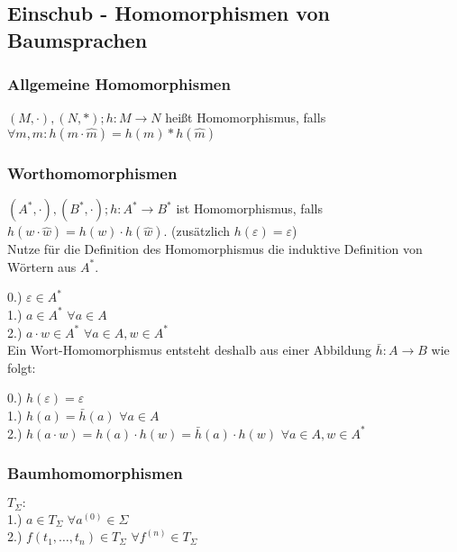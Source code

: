 \documentclass[titlepage]{article}
\begin{document}
\subsection{Einschub - Homomorphismen von Baumsprachen}

\subsubsection{Allgemeine Homomorphismen}

$(M, \cdot), (N, \ast); h: M \to N$ hei\ss t Homomorphismus, falls \\
$\forall m, \hat{m}: h(m \cdot \hat{m}) = h(m) \ast h(\hat{m})$

\subsubsection{Worthomomorphismen}

$(A^\ast, \cdot), (B^\ast, \cdot); h: A^\ast \to B^\ast$ ist Homomorphismus, falls
$h(w \cdot \hat{w}) = h(w) \cdot h(\hat{w})$.
(zus\"atzlich $h(\varepsilon) = \varepsilon$)\\

Nutze f\"ur die Definition des Homomorphismus die induktive Definition von W\"ortern aus 
$A^\ast$.

0.) $\varepsilon \in A^\ast$\\
1.) $a \in A^\ast$ $\forall a \in A$\\
2.) $a \cdot w \in A^\ast$ $\forall a \in A, w \in A^\ast$\\

Ein Wort-Homomorphismus entsteht deshalb aus einer Abbildung $\bar{h}: A \to B$
wie folgt:

0.) $h(\varepsilon) = \varepsilon$\\
1.) $h(a) = \bar{h}(a)$ $\forall a \in A$\\
2.) $h(a \cdot w) = h(a) \cdot h(w) = \bar{h}(a) \cdot h(w)$ $\forall a \in A, w \in A^\ast$\\

\subsubsection{Baumhomomorphismen}

$T_\Sigma:$\\
1.) $a \in T_\Sigma$ $\forall a^{(0)} \in \Sigma$\\
2.) $f(t_1, \dots, t_n) \in T_\Sigma$ $\forall f^{(n)} \in T_\Sigma$\\
\end{document}
